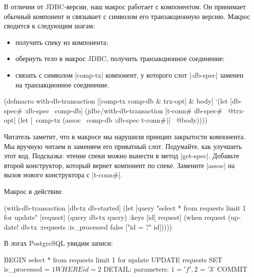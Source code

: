В отличии от JDBC-версии, наш макрос работает с компонентом. Он принимает
обычный компонент и связывает с символом его транзакционную версию. Макрос
сводится к следующим шагам:

\begin{itemize}

\item
  получить спеку из компонента;

\item
  обернуть тело в макрос JDBC, получить транзакционное соединение;

\item
  связать с символом \spverb|comp-tx| компонент, у которого слот \spverb|:db-spec| заменен на
  транзакционное соединение.

\end{itemize}

\begin{english}
  \begin{clojure}
(defmacro with-db-transaction
  [[comp-tx comp-db & trx-opt] & body]
  `(let [{db-spec# :db-spec} ~comp-db]
     (jdbc/with-db-transaction
       [t-conn# db-spec# ~@trx-opt]
       (let [~comp-tx (assoc ~comp-db :db-spec t-conn#)]
         ~@body))))
  \end{clojure}
\end{english}

Читатель заметит, что в макросе мы нарушили принцип закрытости компонента. Мы
вручную читаем и заменяем его приватный слот. Подумайте, как улучшить этот
код. Подсказка: чтение спеки можно вынести в метод \spverb|get-spec|. Добавьте
второй конструктор, который вернет компонент по спеке. Замените \spverb|assoc|
на вызов нового конструктора с \spverb|t-conn#|.

Макрос в действии:

\begin{english}
  \begin{clojure}
(with-db-transaction
  [db-tx db-started]
  (let [query "select * from requests limit 1 for update"
        [request] (query db-tx query)
        {:keys [id]} request]
    (when request
      (update! db-tx :requests
               {:is_processed false}
               ["id = ?" id]))))
  \end{clojure}
\end{english}

В логах PostgreSQL увидим записи:

\begin{english}
  \begin{sql}
BEGIN
select * from requests limit 1 for update
UPDATE requests SET is_processed = $1 WHERE id = $2
DETAIL:  parameters: $1 = 'f', $2 = '3'
COMMIT
  \end{sql}
\end{english}

